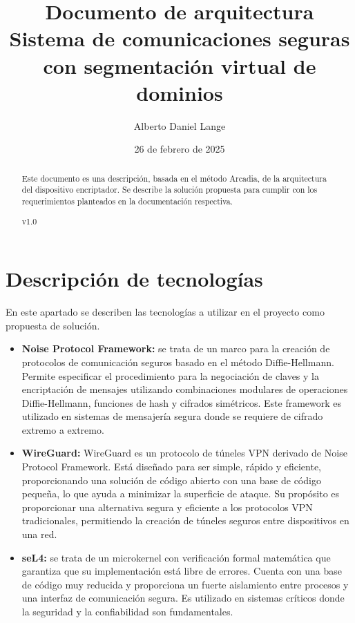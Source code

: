 \documentclass[12pt]{article}
\title{Documento de arquitectura \\
\large Sistema de comunicaciones seguras con segmentación virtual de dominios
}
\author{Alberto Daniel Lange}
\date{26 de febrero de 2025}
\begin{document}
\maketitle
\begin{abstract}
    Este documento es una descripción, basada en el método Arcadia, de la arquitectura del dispositivo encriptador. Se describe la solución propuesta para cumplir con los requerimientos planteados en la documentación respectiva.
    \begin{center}
        v1.0
    \end{center}

\end{abstract}
\tableofcontents
\newpage

\section{Descripción de tecnologías}
En este apartado se describen las tecnologías a utilizar en el proyecto como propuesta de solución. 
\begin{itemize}
    \item \textbf{Noise Protocol Framework:} se trata de un marco para la creación de protocolos de comunicación seguros basado en el método Diffie-Hellmann. Permite especificar el procedimiento para la negociación de claves y la encriptación de mensajes utilizando combinaciones modulares de operaciones Diffie-Hellmann, funciones de hash y cifrados simétricos. Este framework es utilizado en sistemas de mensajería segura donde se requiere de cifrado extremo a extremo.
    
    \item \textbf{WireGuard:} WireGuard es un protocolo de túneles VPN derivado de Noise Protocol Framework. Está diseñado para ser simple, rápido y eficiente, proporcionando una solución de código abierto con una base de código pequeña, lo que ayuda a minimizar la superficie de ataque. Su propósito es proporcionar una alternativa segura y eficiente a los protocolos VPN tradicionales, permitiendo la creación de túneles seguros entre dispositivos en una red. 
    
    \item \textbf{seL4:} se trata de un microkernel con verificación formal matemática que garantiza que su implementación está libre de errores. Cuenta con una base de código muy reducida y proporciona un fuerte aislamiento entre procesos y una interfaz de comunicación segura. Es utilizado en sistemas críticos donde la seguridad y la confiabilidad son fundamentales. 
\end{itemize} 
\end{document}
